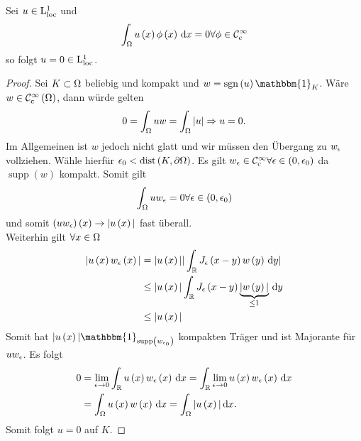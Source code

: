 \begin{lemma}
	Sei $u\in\mathrm{L}^{1}_{\text{loc}}$ und
	\begin{equation*}
		\int_{\Omega}u\left(x\right)\phi\left(x\right)\,\mathrm{d}x = 0 \forall\phi\in\mathcal{C}^{\infty}_{\text{c}}
	\end{equation*}
	so folgt $u=0\in\mathrm{L}^{1}_{\text{loc}}$.
\end{lemma}
\begin{proof}
	Sei $K\subset\Omega$ beliebig und kompakt und $w=\operatorname{sgn}\left(u\right)\mathbbm{1}_{K}$. Wäre $w\in\mathcal{C}^{\infty}_{\text{c}}\left(\Omega\right)$, dann würde gelten
	\begin{equation*}
		0 = \int_{\Omega}uw = \int_{\Omega}|u| \Rightarrow u=0\text{.}
	\end{equation*}
	Im Allgemeinen ist $w$ jedoch nicht glatt und wir müssen den Übergang zu $w_{\epsilon}$ vollziehen. Wähle hierfür $\epsilon_{0}<\operatorname{dist}\left(K,\partial\Omega\right)$. Es gilt $w_{\epsilon}\in\mathcal{C}^{\infty}_{\text{c}}\forall\epsilon\in\left(0,\epsilon_{0}\right)$ da $\operatorname{supp}\left(w\right)$ kompakt.
	Somit gilt
	\begin{equation*}
		\int_{\Omega}uw_{\epsilon} = 0\forall\epsilon\in\left(0,\epsilon_{0}\right)
	\end{equation*}
	und somit $\left(uw_{\epsilon}\right)\left(x\right)\to |u\left(x\right)|$ fast überall.\\
	Weiterhin gilt $\forall x\in\Omega$
	\begin{align*}
		|u\left(x\right)w_{\epsilon}\left(x\right)| &= |u\left(x\right)||\int_{\mathbb{R}}J_{\epsilon}\left(x-y\right)w\left(y\right)\,\mathrm{d}y|\\
			&\leq |u\left(x\right)|\int_{\mathbb{R}}J_{\epsilon}\left(x-y\right)\underbrace{|w\left(y\right)|}_{\leq 1}\,\mathrm{d}y\\
			&\leq |u\left(x\right)|
	\end{align*}
	Somit hat $|u\left(x\right)|\mathbbm{1}_{\operatorname{supp}\left(w_{\e_{0}}\right)}$ kompakten Träger und ist Majorante für $uw_{\epsilon}$. Es folgt
	\begin{align*}
		0 &= \lim_{\epsilon\to 0}\int_{\mathbb{R}}u\left(x\right)w_{\epsilon}\left(x\right)\,\mathrm{d}x = \int_{\mathbb{R}}\lim_{\epsilon\to 0}u\left(x\right)w_{\epsilon}\left(x\right)\,\mathrm{d}x\\
			&= \int_{\Omega}u\left(x\right)w\left(x\right)\,\mathrm{d}x = \int_{\Omega}|u\left(x\right)|\,\mathrm{d}x\text{.}
	\end{align*}
	Somit folgt $u=0$ auf $K$.
\end{proof}
